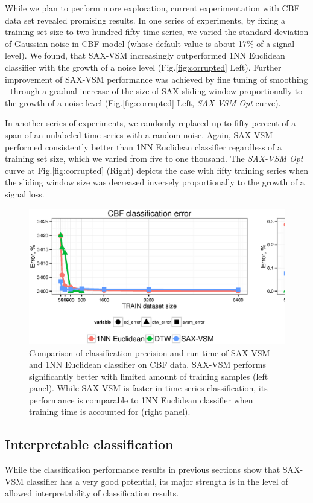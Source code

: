 While we plan to perform more exploration, current experimentation with CBF data set revealed 
promising results. 
In one series of experiments, by fixing a training set size to two hundred fifty time series, we
varied the standard deviation of Gaussian noise in CBF model (whose default value is about 
17\% of a signal level). We found, that SAX-VSM increasingly outperformed 1NN Euclidean classifier 
with the growth of a noise level (Fig.\ref{fig:corrupted} Left). 
Further improvement of SAX-VSM performance was achieved by fine tuning of smoothing - 
through a gradual increase of the size of SAX sliding window proportionally to the growth of 
a noise level (Fig.\ref{fig:corrupted} Left, \textit{SAX-VSM Opt} curve). 

In another series of experiments, we randomly replaced up to fifty percent of a span of an 
unlabeled time series with a random noise. 
Again, SAX-VSM performed consistently better than 1NN Euclidean classifier regardless of a 
training set size, which we varied from five to one thousand. 
The \textit{SAX-VSM Opt} curve at Fig.\ref{fig:corrupted} (Right) depicts the case
with fifty training series when the sliding window size was decreased inversely proportionally 
to the growth of a signal loss.


\begin{figure}[ht]
   \includegraphics[width=120mm]{figures/precision-synt.ps}
   \caption{Comparison of classification precision and run time of SAX-VSM and 1NN 
   Euclidean classifier on CBF data. SAX-VSM performs significantly better with limited 
   amount of training samples (left panel). While SAX-VSM is faster in time series 
   classification, its performance is comparable to 1NN Euclidean classifier when 
   training time is accounted for (right panel).}
   \label{fig:precision-runtime}
\end{figure}

\subsection{Interpretable classification}
While the classification performance results in previous sections show that SAX-VSM 
classifier has a very good potential, its major strength is in the level of allowed 
interpretability of classification results. 

